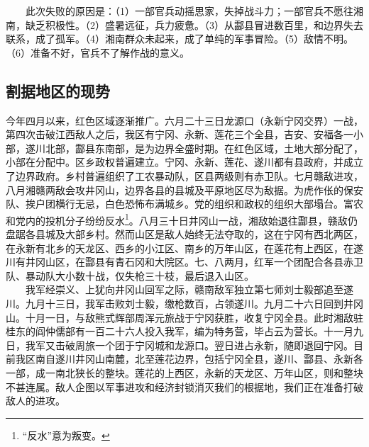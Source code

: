 \documentclass[cn,11pt,chinese]{elegantbook}
\def\myformat#1{\hfil\hfil #1}
\begin{document}
　　此次失败的原因是：（1）一部官兵动摇思家，失掉战斗力；一部官兵不愿往湘南，缺乏积极性。（2）盛暑远征，兵力疲惫。（3）从酃县冒进数百里，和边界失去联系，成了孤军。（4）湘南群众未起来，成了单纯的军事冒险。（5）敌情不明。（6）准备不好，官兵不了解作战的意义。\\
\subsection*{\myformat{割据地区的现势}}
今年四月以来，红色区域逐渐推广。六月二十三日龙源口（永新宁冈交界）一战，第四次击破江西敌人之后，我区有宁冈、永新、莲花三个全县，吉安、安福各一小部，遂川北部，酃县东南部，是为边界全盛时期。在红色区域，土地大部分配了，小部在分配中。区乡政权普遍建立。宁冈、永新、莲花、遂川都有县政府，并成立了边界政府。乡村普遍组织了工农暴动队，区县两级则有赤卫队。七月赣敌进攻，八月湘赣两敌会攻井冈山，边界各县的县城及平原地区尽为敌据。为虎作伥的保安队、挨户团横行无忌，白色恐怖布满城乡。党的组织和政权的组织大部塌台。富农和党内的投机分子纷纷反水\footnote[7]{ “反水”意为叛变。}。八月三十日井冈山一战，湘敌始退往酃县，赣敌仍盘踞各县城及大部乡村。然而山区是敌人始终无法夺取的，这在宁冈有西北两区，在永新有北乡的天龙区、西乡的小江区、南乡的万年山区，在莲花有上西区，在遂川有井冈山区，在酃县有青石冈和大院区。七、八两月，红军一个团配合各县赤卫队、暴动队大小数十战，仅失枪三十枝，最后退入山区。\\
　　我军经崇义、上犹向井冈山回军之际，赣南敌军独立第七师刘士毅部追至遂川。九月十三日，我军击败刘士毅，缴枪数百，占领遂川。九月二十六日回到井冈山。十月一日，与敌熊式辉部周浑元旅战于宁冈获胜，收复宁冈全县。此时湘敌驻桂东的阎仲儒部有一百二十六人投入我军，编为特务营，毕占云为营长。十一月九日，我军又击破周旅一个团于宁冈城和龙源口。翌日进占永新，随即退回宁冈。目前我区南自遂川井冈山南麓，北至莲花边界，包括宁冈全县，遂川、酃县、永新各一部，成一南北狭长的整块。莲花的上西区，永新的天龙区、万年山区，则和整块不甚连属。敌人企图以军事进攻和经济封锁消灭我们的根据地，我们正在准备打破敌人的进攻。\\
\end{document}
